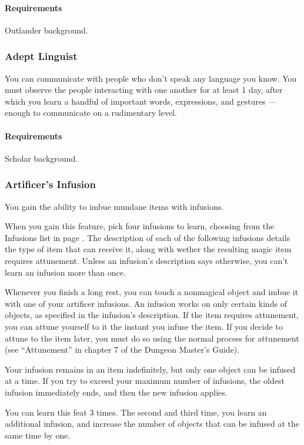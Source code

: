     \paragraph{Requirements} Outlander background.
\subsubsection{Adept Linguist} \label{feat::adeptlinguist}
    You can communicate with people who don't speak any language you know.
    You must observe the people interacting with one another for at least 1 day, after which you learn a handful of important words, expressions, and gestures --- enough to communicate on a rudimentary level.
    \paragraph{Requirements} Scholar background.
\subsubsection{Artificer's Infusion} \label{feat::artificersinfusion}
    You gain the ability to imbue mundane items with infusions.

    When you gain this feature, pick four infusions to learn, choosing from the Infusions list in page \pageref{ssec::infusions}.
    The description of each of the following infusions details the type of item that can receive it, along with wether the resulting magic item requires attunement.
    Unless an infusion's description says otherwise, you can't learn an infusion more than once.

    Whenever you finish a long rest, you can touch a nonmagical object and imbue it with one of your artificer infusions.
    An infusion works on only certain kinds of objects, as specified in the infusion's description.
    If the item requires attunement, you can attune yourself to it the instant you infuse the item.
    If you decide to attune to the item later, you must do so using the normal process for attunement (see ``Attunement'' in chapter 7 of the Dungeon Master's Guide).

    Your infusion remains in an item indefinitely, but only one object can be infused at a time.
    If you try to exceed your maximum number of infusions, the oldest infusion immediately ends, and then the new infusion applies.

    You can learn this feat 3 times.
    The second and third time, you learn an additional infusion, and increase the number of objects that can be infused at the same time by one.

